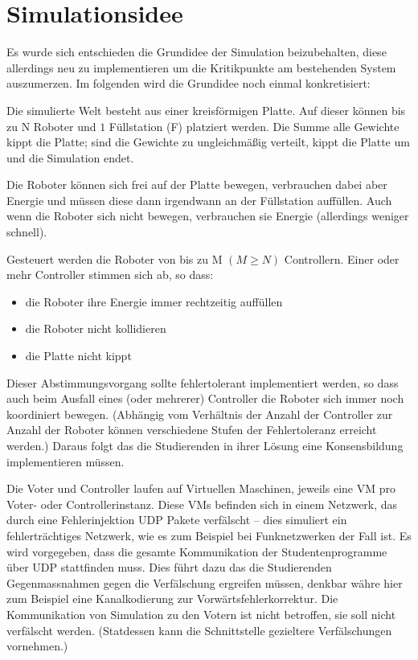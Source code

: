 \clearpage
\section{Simulationsidee}
Es wurde sich entschieden die Grundidee der Simulation beizubehalten, diese allerdings neu zu implementieren um die Kritikpunkte am
bestehenden System auszumerzen. Im folgenden wird die Grundidee noch einmal konkretisiert:

Die simulierte Welt besteht aus einer kreisf{\"{o}}rmigen Platte. Auf dieser k{\"{o}}nnen bis zu \gls{N}
Roboter und $1$ F{\"{u}}llstation (\gls{F}) platziert werden. Die Summe alle Gewichte kippt die Platte;
sind die Gewichte zu ungleichm{\"{a}}{\ss}ig verteilt, kippt die Platte um und die Simulation endet.

Die Roboter k{\"{o}}nnen sich frei auf der Platte bewegen, verbrauchen dabei aber Energie und m{\"{u}}ssen diese dann irgendwann
an der F{\"{u}}llstation auff{\"{u}}llen. Auch wenn die Roboter sich nicht bewegen, verbrauchen sie Energie (allerdings weniger
schnell).

Gesteuert werden die Roboter von bis zu \gls{M} $(M \geq N)$ Controllern. Einer oder mehr Controller stimmen sich ab,
so dass:
\begin{itemize}
\item die Roboter ihre Energie immer rechtzeitig auff{\"{u}}llen
\item die Roboter nicht kollidieren
\item die Platte nicht kippt
\end{itemize}

Dieser Abstimmungsvorgang sollte fehlertolerant implementiert werden, so dass auch beim Ausfall eines (oder mehrerer) Controller die Roboter sich immer noch koordiniert bewegen.
(Abh{\"{a}}ngig vom Verh{\"{a}}ltnis der Anzahl der Controller zur Anzahl der Roboter k{\"{o}}nnen verschiedene Stufen der Fehlertoleranz erreicht werden.\cite[s.149]{Werner00})
Daraus folgt das die Studierenden in ihrer L{\"{o}}sung eine Konsensbildung implementieren m{\"{u}}ssen.

Die Voter und Controller laufen auf Virtuellen Maschinen, jeweils eine VM pro Voter- oder Controllerinstanz.
Diese VMs befinden sich in einem Netzwerk, das durch eine Fehlerinjektion UDP Pakete verf{\"{a}}lscht --
dies simuliert ein fehlertr{\"{a}}chtiges Netzwerk, wie es zum Beispiel bei Funknetzwerken der Fall ist.
Es wird vorgegeben, dass die gesamte Kommunikation der Studentenprogramme {\"{u}}ber UDP stattfinden muss.
Dies f{\"{u}}hrt dazu das die Studierenden Gegenmassnahmen gegen die Verf{\"{a}}lschung ergreifen m{\"{u}}ssen, denkbar
w{\"{a}}hre hier zum Beispiel eine Kanalkodierung zur Vorw{\"{a}}rtsfehlerkorrektur.
Die Kommunikation von Simulation zu den Votern ist nicht betroffen, sie soll nicht verf{\"{a}}lscht werden. (Statdessen
kann die Schnittstelle gezieltere Verf{\"{a}}lschungen vornehmen.)

